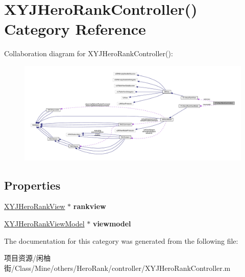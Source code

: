 \hypertarget{category_x_y_j_hero_rank_controller_07_08}{}\section{X\+Y\+J\+Hero\+Rank\+Controller() Category Reference}
\label{category_x_y_j_hero_rank_controller_07_08}


Collaboration diagram for X\+Y\+J\+Hero\+Rank\+Controller()\+:\nopagebreak
\begin{figure}[H]
\begin{center}
\leavevmode
\includegraphics[width=350pt]{category_x_y_j_hero_rank_controller_07_08__coll__graph}
\end{center}
\end{figure}
\subsection*{Properties}
\begin{DoxyCompactItemize}
\item 
\mbox{\label{category_x_y_j_hero_rank_controller_07_08_a6891e6905a21790fc2e073292a0939d6}} 
\mbox{\hyperlink{interface_x_y_j_hero_rank_view}{X\+Y\+J\+Hero\+Rank\+View}} $\ast$ {\bfseries rankview}
\item 
\mbox{\label{category_x_y_j_hero_rank_controller_07_08_a6cabddbbd2e87dc91265f17a5091d388}} 
\mbox{\hyperlink{interface_x_y_j_hero_rank_view_model}{X\+Y\+J\+Hero\+Rank\+View\+Model}} $\ast$ {\bfseries viewmodel}
\end{DoxyCompactItemize}


The documentation for this category was generated from the following file\+:\begin{DoxyCompactItemize}
\item 
项目资源/闲柚街/\+Class/\+Mine/others/\+Hero\+Rank/controller/X\+Y\+J\+Hero\+Rank\+Controller.\+m\end{DoxyCompactItemize}
